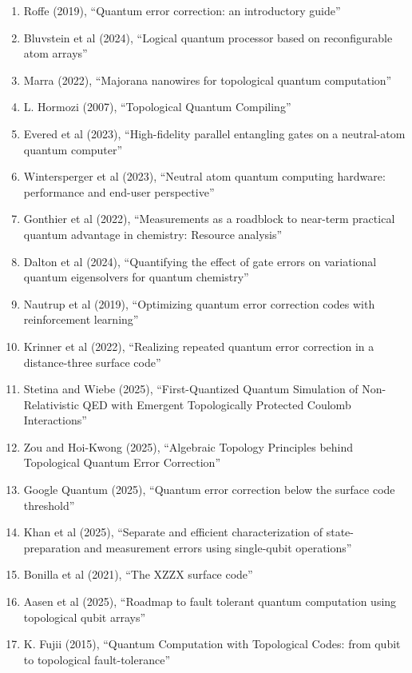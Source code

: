 \documentclass[]{article}
\begin{document}
\begin{enumerate}
\item Roffe (2019)\cite{roffe2019quantum}, ``Quantum error correction: an introductory guide''
\item Bluvstein et al (2024)\cite{bluvstein2024logical}, ``Logical quantum processor based on reconfigurable atom arrays''
\item Marra (2022)\cite{marra2022majorana}, ``Majorana nanowires for topological quantum computation''
\item L. Hormozi (2007)\cite{L_Hormozi_thesis}, ``Topological Quantum Compiling''
\item Evered et al (2023)\cite{evered2023high}, ``High-fidelity parallel entangling gates on a neutral-atom quantum computer''
\item Wintersperger et al (2023)\cite{wintersperger2023neutral}, ``Neutral atom quantum computing hardware: performance and end-user perspective''
\item Gonthier et al (2022)\cite{gonthier2022measurements}, ``Measurements as a roadblock to near-term practical quantum advantage in chemistry: Resource analysis''
\item Dalton et al (2024)\cite{dalton2024quantifying}, ``Quantifying the effect of gate errors on variational quantum eigensolvers for quantum chemistry''
\item Nautrup et al (2019)\cite{nautrup2019optimizing}, ``Optimizing quantum error correction codes with reinforcement learning''
\item Krinner et al (2022)\cite{krinner2022realizing}, ``Realizing repeated quantum error correction in a distance-three surface code''
\item Stetina and Wiebe (2025)\cite{stetina2025firstquantizedquantumsimulationnonrelativistic}, ``First-Quantized Quantum Simulation of Non-Relativistic QED with Emergent Topologically Protected Coulomb Interactions''
\item Zou and Hoi-Kwong (2025)\cite{zou2025algebraic}, ``Algebraic Topology Principles behind Topological Quantum Error Correction''
\item Google Quantum (2025)\cite{google2025quantum}, ``Quantum error correction below the surface code threshold''
\item Khan et al (2025)\cite{khan2025separate}, ``Separate and efficient characterization of state-preparation and measurement errors using single-qubit operations''
\item Bonilla et al (2021)\cite{bonilla2021xzzx}, ``The XZZX surface code''
\item Aasen et al (2025)\cite{aasen2025roadmapfaulttolerantquantum}, ``Roadmap to fault tolerant quantum computation using topological qubit arrays''
\item K. Fujii (2015)\cite{fujii2015quantumcomputationtopologicalcodes}, ``Quantum Computation with Topological Codes: from qubit to topological fault-tolerance''
\end{enumerate}






\end{document}
